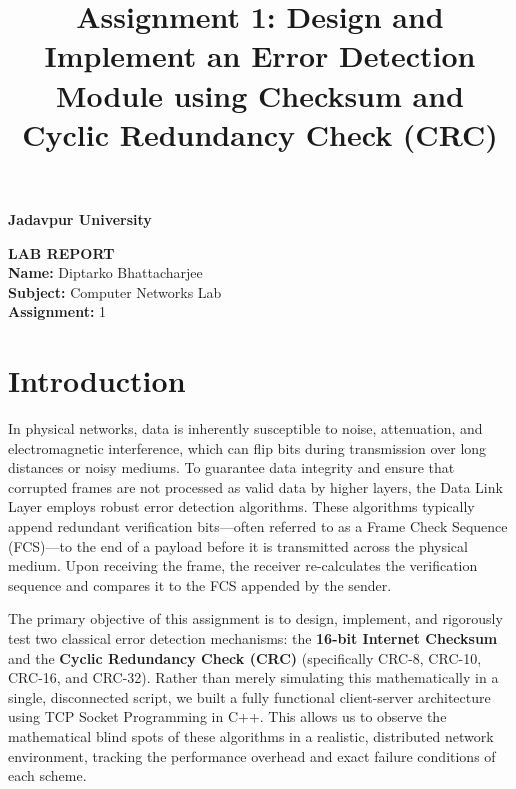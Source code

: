 \documentclass[12pt, a4paper]{article}
\begin{document}
\begin{titlepage}
    \centering
    \vspace*{1cm}
    
    {\Huge \textbf{Jadavpur University}}\\[3 cm]
    
    \vspace{4cm}
    
    {\huge \textbf{LAB REPORT}}\\[2cm]
    
    {\Large
    \textbf{Name:} Diptarko Bhattacharjee\\[0.75 cm]
    \textbf{Subject:} Computer Networks Lab\\[0.75 cm]
    \textbf{Assignment:} 1
    }
    
\end{titlepage}

\newpage
\tableofcontents
\newpage


\title{Assignment 1: Design and Implement an Error Detection Module using Checksum and Cyclic Redundancy Check (CRC)}
\date{}
\maketitle


\section{Introduction}
In physical networks, data is inherently susceptible to noise, attenuation, and electromagnetic interference, which can flip bits during transmission over long distances or noisy mediums. To guarantee data integrity and ensure that corrupted frames are not processed as valid data by higher layers, the Data Link Layer employs robust error detection algorithms. These algorithms typically append redundant verification bits---often referred to as a Frame Check Sequence (FCS)---to the end of a payload before it is transmitted across the physical medium. Upon receiving the frame, the receiver re-calculates the verification sequence and compares it to the FCS appended by the sender.

The primary objective of this assignment is to design, implement, and rigorously test two classical error detection mechanisms: the \textbf{16-bit Internet Checksum} and the \textbf{Cyclic Redundancy Check (CRC)} (specifically CRC-8, CRC-10, CRC-16, and CRC-32). Rather than merely simulating this mathematically in a single, disconnected script, we built a fully functional client-server architecture using TCP Socket Programming in C++. This allows us to observe the mathematical blind spots of these algorithms in a realistic, distributed network environment, tracking the performance overhead and exact failure conditions of each scheme.
\end{document}
